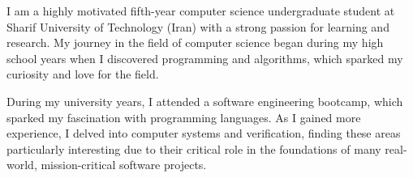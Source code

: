 

\begin{cvparagraph}

I am a highly motivated fifth-year computer science undergraduate student at Sharif University of Technology (Iran) with a strong passion for learning and research. My journey in the field of computer science began during my high school years when I discovered programming and algorithms, which sparked my curiosity and love for the field.

During my university years, I attended a software engineering bootcamp, which sparked my fascination with programming languages. As I gained more experience, I delved into computer systems and verification, finding these areas particularly interesting due to their critical role in the foundations of many real-world, mission-critical software projects.

\end{cvparagraph}
